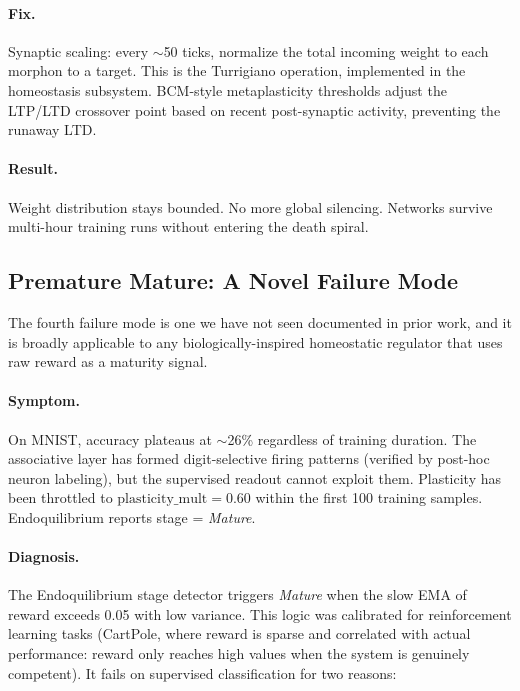 \paragraph{Fix.}
Synaptic scaling: every $\sim$50 ticks, normalize the total incoming weight to each morphon to a target. This is the Turrigiano operation, implemented in the homeostasis subsystem. BCM-style metaplasticity thresholds adjust the LTP/LTD crossover point based on recent post-synaptic activity, preventing the runaway LTD.

\paragraph{Result.}
Weight distribution stays bounded. No more global silencing. Networks survive multi-hour training runs without entering the death spiral.

\subsection{Premature Mature: A Novel Failure Mode}
\label{sec:premature_mature}

The fourth failure mode is one we have not seen documented in prior work, and it is broadly applicable to any biologically-inspired homeostatic regulator that uses raw reward as a maturity signal.

\paragraph{Symptom.}
On MNIST, accuracy plateaus at $\sim$26\% regardless of training duration. The associative layer has formed digit-selective firing patterns (verified by post-hoc neuron labeling), but the supervised readout cannot exploit them. Plasticity has been throttled to $\text{plasticity\_mult}=0.60$ within the first 100 training samples. Endoquilibrium reports stage = \emph{Mature}.

\paragraph{Diagnosis.}
The Endoquilibrium stage detector triggers \emph{Mature} when the slow EMA of reward exceeds 0.05 with low variance. This logic was calibrated for reinforcement learning tasks (CartPole, where reward is sparse and correlated with actual performance: reward only reaches high values when the system is genuinely competent). It fails on supervised classification for two reasons:

